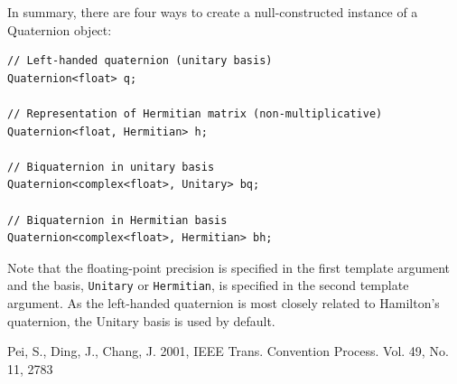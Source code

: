 \documentclass[12pt]{article}
\newcommand{\code}[1]{{\tt{#1}}}
\begin{document}
In summary, there are four ways to create a null-constructed instance
of a Quaternion object:
\begin{verbatim}
// Left-handed quaternion (unitary basis)
Quaternion<float> q;

// Representation of Hermitian matrix (non-multiplicative)
Quaternion<float, Hermitian> h;

// Biquaternion in unitary basis
Quaternion<complex<float>, Unitary> bq;

// Biquaternion in Hermitian basis
Quaternion<complex<float>, Hermitian> bh;
\end{verbatim}
Note that the floating-point precision is specified in the first
template argument and the basis, \code{Unitary} or \code{Hermitian},
is specified in the second template argument. As the left-handed
quaternion is most closely related to Hamilton's quaternion, the
Unitary basis is used by default.

\begin{thebibliography}{}

Pei, S., Ding, J., Chang, J. 2001,  IEEE Trans. Convention Process. Vol. 49,
No. 11, 2783

\end{thebibliography}
\end{document}
